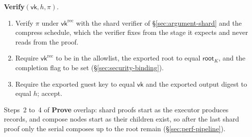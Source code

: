 \begin{protocol}
\noindent\textbf{Verify}$(\mathsf{vk}, h, \pi)$.
\begin{enumerate}
  \item Verify $\pi$ under $\mathsf{vk}^{\mathrm{rec}}$ with the shard verifier of \S\ref{sec:argument-shard} and the compress schedule, which the verifier fixes from the stage it expects and never reads from the proof.
  \item Require $\mathsf{vk}^{\mathrm{rec}}$ to be in the allowlist, the exported root to equal $\mathsf{root}_K$, and the completion flag to be set (\S\ref{sec:security-binding}).
  \item Require the exported guest key to equal $\mathsf{vk}$ and the exported output digest to equal $h$; accept.
\end{enumerate}
\end{protocol}

Steps~2 to~4 of \textbf{Prove} overlap: shard proofs start as the executor produces records, and compose nodes start as their children exist, so after the last shard proof only the serial composes up to the root remain (\S\ref{sec:perf-pipeline}).
